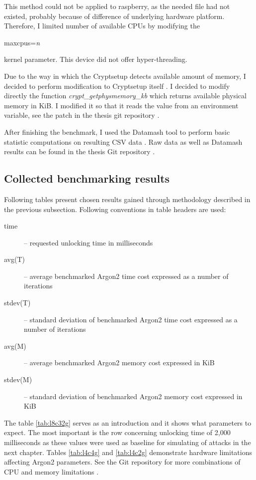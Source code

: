\documentclass[nolof]{fithesis3}
\begin{document}
This method could not be applied to raspberry, as the needed file had not existed, probably because of difference of underlying hardware platform. Therefore, I limited number of available CPUs by modifying the 
\begin{tt}
maxcpus=\emph{n}
\end{tt}
 kernel parameter. This device did not offer hyper-threading.

Due to the way in which the Cryptsetup detects available amount of memory, I decided to perform modification to Cryptsetup itself \parencite{cryptsetuputils}. I decided to modify directly the function \emph{crypt\_getphysmemory\_kb} which returns available physical memory in KiB. I modified it so that it reads the value from an environment variable, see the patch in the thesis git repository \parencite{thesisrepo}.

After finishing the benchmark, I used the Datamash tool to perform basic statistic computations on resulting CSV data \parencite{datamash}. Raw data as well as Datamash results can be found in the thesis Git repository \parencite{thesisrepo}.

\FloatBarrier

\subsection{Collected benchmarking results}
Following tables present chosen results gained through methodology described in the previous subsection. Following conventions in table headers are used:

\begin{description}
\item[time] -- requested unlocking time in milliseconds

\item[avg(T)] -- average benchmarked Argon2 time cost expressed as a number of iterations

\item[stdev(T)] -- standard deviation of benchmarked Argon2 time cost expressed as a number of iterations

\item[avg(M)] -- average benchmarked Argon2 memory cost expressed in KiB

\item[stdev(M)] -- standard deviation of benchmarked Argon2 memory cost expressed in KiB
\end{description}

The table \ref{tab:l8c32g} serves as an introduction and it shows what parameters to expect. The most important is the row concerning unlocking time of 2,000 milliseconds as these values were used as baseline for simulating of attacks in the next chapter. Tables \ref{tab:l4c4g} and \ref{tab:l4c2g} demonstrate hardware limitations affecting Argon2 parameters. See the Git repository for more combinations of CPU and memory limitations \parencite{thesisrepo}.
\end{document}

